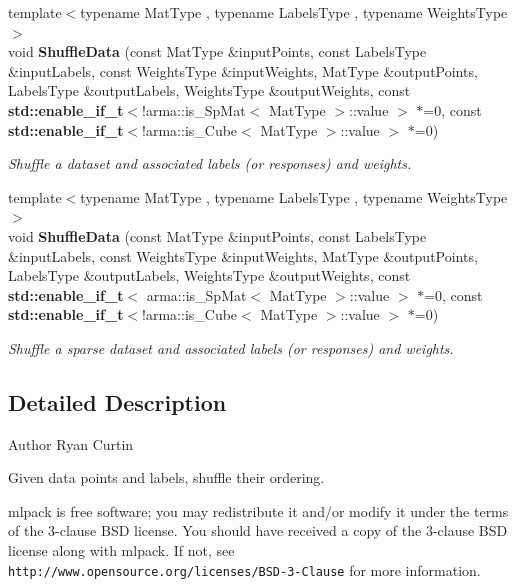\begin{DoxyCompactItemize}
{\footnotesize template$<$typename Mat\+Type , typename Labels\+Type , typename Weights\+Type $>$ }\\void \textbf{ Shuffle\+Data} (const Mat\+Type \&input\+Points, const Labels\+Type \&input\+Labels, const Weights\+Type \&input\+Weights, Mat\+Type \&output\+Points, Labels\+Type \&output\+Labels, Weights\+Type \&output\+Weights, const \textbf{ std\+::enable\+\_\+if\+\_\+t}$<$!arma\+::is\+\_\+\+Sp\+Mat$<$ Mat\+Type $>$\+::value $>$ $\ast$=0, const \textbf{ std\+::enable\+\_\+if\+\_\+t}$<$!arma\+::is\+\_\+\+Cube$<$ Mat\+Type $>$\+::value $>$ $\ast$=0)
\begin{DoxyCompactList}\small\item\em Shuffle a dataset and associated labels (or responses) and weights. \end{DoxyCompactList}\item 
{\footnotesize template$<$typename Mat\+Type , typename Labels\+Type , typename Weights\+Type $>$ }\\void \textbf{ Shuffle\+Data} (const Mat\+Type \&input\+Points, const Labels\+Type \&input\+Labels, const Weights\+Type \&input\+Weights, Mat\+Type \&output\+Points, Labels\+Type \&output\+Labels, Weights\+Type \&output\+Weights, const \textbf{ std\+::enable\+\_\+if\+\_\+t}$<$ arma\+::is\+\_\+\+Sp\+Mat$<$ Mat\+Type $>$\+::value $>$ $\ast$=0, const \textbf{ std\+::enable\+\_\+if\+\_\+t}$<$!arma\+::is\+\_\+\+Cube$<$ Mat\+Type $>$\+::value $>$ $\ast$=0)
\begin{DoxyCompactList}\small\item\em Shuffle a sparse dataset and associated labels (or responses) and weights. \end{DoxyCompactList}\end{DoxyCompactItemize}


\subsection{Detailed Description}
\begin{DoxyAuthor}{Author}
Ryan Curtin
\end{DoxyAuthor}
Given data points and labels, shuffle their ordering.

mlpack is free software; you may redistribute it and/or modify it under the terms of the 3-\/clause B\+SD license. You should have received a copy of the 3-\/clause B\+SD license along with mlpack. If not, see {\tt http\+://www.\+opensource.\+org/licenses/\+B\+S\+D-\/3-\/\+Clause} for more information. 